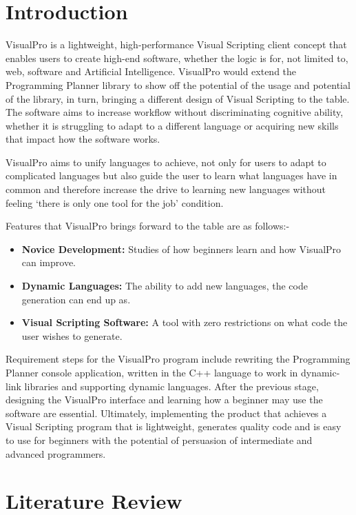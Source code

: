 \documentclass[12pt]{report} %
\begin{document}
\chapter{Introduction}
	VisualPro is a lightweight, high-performance Visual Scripting client concept that enables users to create high-end software, whether the logic is for, not limited to, web, software and Artificial Intelligence. VisualPro would extend the Programming Planner library to show off the potential of the usage and potential of the library, in turn, bringing a different design of Visual Scripting to the table. The software aims to increase workflow without discriminating cognitive ability, whether it is struggling to adapt to a different language or acquiring new skills that impact how the software works. 

	VisualPro aims to unify languages to achieve, not only for users to adapt to complicated languages but also guide the user to learn what languages have in common and therefore increase the drive to learning new languages without feeling `there is only one tool for the job' condition.

	Features that VisualPro brings forward to the table are as follows:-
	\begin{itemize}
		\item \textbf{Novice Development:} Studies of how beginners learn and how VisualPro can improve.
		\item \textbf{Dynamic Languages:} The ability to add new languages, the code generation can end up as.
		\item \textbf{Visual Scripting Software:} A tool with zero restrictions on what code the user wishes to generate.
	\end{itemize}

	Requirement steps for the VisualPro program include rewriting the Programming Planner console application, written in the C++ language to work in dynamic-link libraries and supporting dynamic languages. After the previous stage, designing the VisualPro interface and learning how a beginner may use the software are essential. Ultimately, implementing the product that achieves a Visual Scripting program that is lightweight, generates quality code and is easy to use for beginners with the potential of persuasion of intermediate and advanced programmers.

\chapter{Literature Review}
\label{sec:literatureReview}
\end{document}
